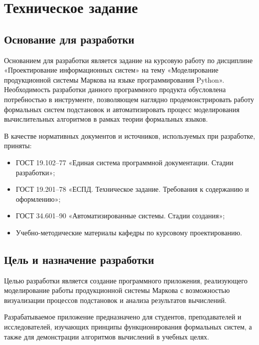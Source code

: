 \section{Техническое задание}

\subsection{Основание для разработки}

Основанием для разработки является задание на курсовую работу по дисциплине «Проектирование информационных систем» на тему «Моделирование продукционной системы Маркова на языке программирования Python».  
Необходимость разработки данного программного продукта обусловлена потребностью в инструменте, позволяющем наглядно продемонстрировать работу формальных систем подстановок и автоматизировать процесс моделирования вычислительных алгоритмов в рамках теории формальных языков.  

В качестве нормативных документов и источников, используемых при разработке, приняты:
\begin{itemize}
	\item ГОСТ 19.102–77 «Единая система программной документации. Стадии разработки»;
	\item ГОСТ 19.201–78 «ЕСПД. Техническое задание. Требования к содержанию и оформлению»;
	\item ГОСТ 34.601–90 «Автоматизированные системы. Стадии создания»;
	\item Учебно-методические материалы кафедры по курсовому проектированию.
\end{itemize}

\subsection{Цель и назначение разработки}

Целью разработки является создание программного приложения, реализующего моделирование работы продукционной системы Маркова с возможностью визуализации процессов подстановок и анализа результатов вычислений.  

Разрабатываемое приложение предназначено для студентов, преподавателей и исследователей, изучающих принципы функционирования формальных систем, а также для демонстрации алгоритмов вычислений в учебных целях.  

